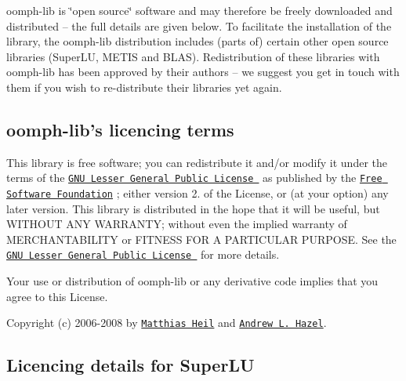 {\ttfamily oomph-\/lib} is \char`\"{}open source\char`\"{} software and may therefore be freely downloaded and distributed -- the full details are given below. To facilitate the installation of the library, the {\ttfamily oomph-\/lib} distribution includes (parts of) certain other open source libraries (Super\-L\-U, M\-E\-T\-I\-S and B\-L\-A\-S). Redistribution of these libraries with {\ttfamily oomph-\/lib} has been approved by their authors -- we suggest you get in touch with them if you wish to re-\/distribute their libraries yet again.





\subsection*{{\ttfamily oomph-\/lib's} licencing terms}

This library is free software; you can redistribute it and/or modify it under the terms of the \href{http://www.gnu.org/licenses/lgpl.html}{\tt G\-N\-U Lesser General Public License } as published by the \href{http://www.fsf.org/}{\tt Free Software Foundation} ; either version 2. of the License, or (at your option) any later version. This library is distributed in the hope that it will be useful, but W\-I\-T\-H\-O\-U\-T A\-N\-Y W\-A\-R\-R\-A\-N\-T\-Y; without even the implied warranty of M\-E\-R\-C\-H\-A\-N\-T\-A\-B\-I\-L\-I\-T\-Y or F\-I\-T\-N\-E\-S\-S F\-O\-R A P\-A\-R\-T\-I\-C\-U\-L\-A\-R P\-U\-R\-P\-O\-S\-E. See the \href{http://www.gnu.org/licenses/lgpl.html}{\tt G\-N\-U Lesser General Public License } for more details.

\par
 \par


Your use or distribution of {\ttfamily oomph-\/lib} or any derivative code implies that you agree to this License.

\par
 \par
 Copyright (c) 2006-\/2008 by \href{http://www.maths.man.ac.uk/~mheil}{\tt Matthias Heil} and \href{http://www.maths.man.ac.uk/~ahazel}{\tt Andrew L. Hazel}.





\subsection*{Licencing details for Super\-L\-U}

